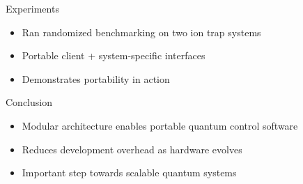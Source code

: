 \documentclass[18 pt]{beamer}
\begin{document}
\begin{frame}{Experiments}
\begin{itemize}
\item Ran randomized benchmarking on two ion trap systems
\item Portable client + system-specific interfaces
\item Demonstrates portability in action
\end{itemize}
\end{frame}

\begin{frame}{Conclusion}
\begin{itemize}
\item Modular architecture enables portable quantum control software
\item Reduces development overhead as hardware evolves
\item Important step towards scalable quantum systems
\end{itemize}

\end{frame}
\end{document}
